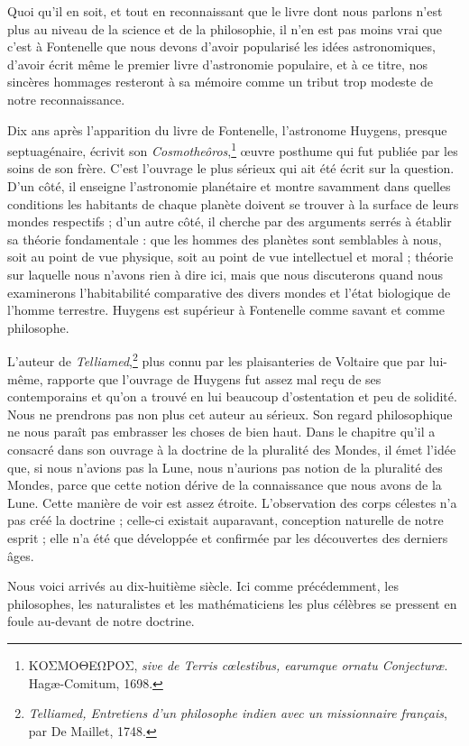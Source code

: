 \documentclass[a4paper, 11pt, oneside, landscape]{article}
\begin{document}
Quoi qu'il en soit, et tout en reconnaissant que le livre dont nous parlons n'est plus au niveau de la science et de la philosophie, il n'en est pas moins vrai que c'est à Fontenelle que nous devons d'avoir popularisé les idées astronomiques, d'avoir écrit même le premier livre d'astronomie populaire, et à ce titre, nos sincères hommages resteront à sa mémoire comme un tribut trop modeste de notre reconnaissance.

Dix ans après l'apparition du livre de Fontenelle, l'astronome Huygens, presque septuagénaire, écrivit son \emph{Cosmotheôros},\footnote{ΚΟΣΜΟΘΕΩΡΟΣ, \emph{sive de Terris cœlestibus, earumque ornatu Conjecturæ}. Hagæ-Comitum, 1698.} œuvre posthume qui fut publiée par les soins de son frère. C'est l'ouvrage le plus sérieux qui ait été écrit sur la question. D'un côté, il enseigne l'astronomie planétaire et montre savamment dans quelles conditions les habitants de chaque planète doivent se trouver à la surface de leurs mondes respectifs ; d'un autre côté, il cherche par des arguments serrés à établir sa théorie fondamentale : que les hommes des planètes sont semblables à nous, soit au point de vue physique, soit au point de vue intellectuel et moral ; théorie sur laquelle nous n'avons rien à dire ici, mais que nous discuterons quand nous examinerons l'habitabilité comparative des divers mondes et l'état biologique de l'homme terrestre. Huygens est supérieur à Fontenelle comme savant et comme philosophe.

L'auteur de \emph{Telliamed},\footnote{\emph{Telliamed, Entretiens d'un philosophe indien avec un missionnaire français}, par De Maillet, 1748.} plus connu par les plaisanteries de Voltaire que par lui-même, rapporte que l'ouvrage de Huygens fut assez mal reçu de ses contemporains et qu'on a trouvé en lui beaucoup d'ostentation et peu de solidité. Nous ne prendrons pas non plus cet auteur au sérieux. Son regard philosophique ne nous paraît pas embrasser les choses de bien haut. Dans le chapitre qu'il a consacré dans son ouvrage à la doctrine de la pluralité des Mondes, il émet l'idée que, si nous n'avions pas la Lune, nous n'aurions pas notion de la pluralité des Mondes, parce que cette notion dérive de la connaissance que nous avons de la Lune. Cette manière de voir est assez étroite. L'observation des corps célestes n'a pas créé la doctrine ; celle-ci existait auparavant, conception naturelle de notre esprit ; elle n'a été que développée et confirmée par les découvertes des derniers âges.

Nous voici arrivés au dix-huitième siècle. Ici comme précédemment, les philosophes, les naturalistes et les mathématiciens les plus célèbres se pressent en foule au-devant de notre doctrine.
\end{document}
